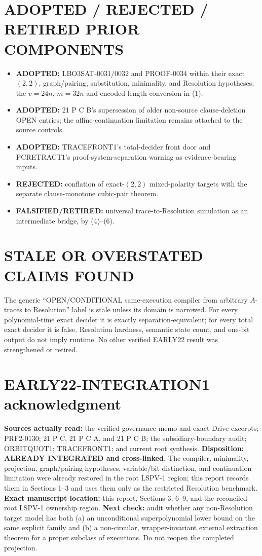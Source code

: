 \documentclass[11pt]{article}
\begin{document}
\section{ADOPTED / REJECTED / RETIRED PRIOR COMPONENTS}
\begin{itemize}
\item \textbf{ADOPTED:} LBO3SAT-0031/0032 and PROOF-0034 within their exact
$(2,2)$, graph/pairing, substitution, minimality, and Resolution hypotheses;
the $v=24n$, $m=32n$ and encoded-length conversion in (1).
\item \textbf{ADOPTED:} 21 P C B's supersession of older non-source
clause-deletion OPEN entries; the affine-continuation limitation remains
attached to the source controls.
\item \textbf{ADOPTED:} TRACEFRONT1's total-decider front door and
PCRETRACT1's proof-system-separation warning as evidence-bearing inputs.
\item \textbf{REJECTED:} conflation of exact-$(2,2)$ mixed-polarity targets
with the separate clause-monotone cubic-pair theorem.
\item \textbf{FALSIFIED/RETIRED:} universal trace-to-Resolution simulation
as an intermediate bridge, by (4)--(6).
\end{itemize}

\section{STALE OR OVERSTATED CLAIMS FOUND}
The generic ``OPEN/CONDITIONAL same-execution compiler from arbitrary
$A$-traces to Resolution'' label is stale unless its domain is narrowed.
For every polynomial-time exact decider it is exactly separation-equivalent;
for every total exact decider it is false.  Resolution hardness, semantic
state count, and one-bit output do not imply runtime.  No other verified
EARLY22 result was strengthened or retired.

\section{EARLY22-INTEGRATION1 acknowledgment}
\textbf{Sources actually read:} the verified governance memo and exact Drive
excerpts; PRF2-0130; 21 P C, 21 P C A, and 21 P C B; the subsidiary-boundary
audit; ORBITQUOT1; TRACEFRONT1; and current root synthesis.
\textbf{Disposition: ALREADY INTEGRATED and cross-linked.}  The compiler,
minimality, projection, graph/pairing hypotheses, variable/bit distinction,
and continuation limitation were already restored in the root LSPV-1 region;
this report records them in Sections 1--3 and uses them only as the restricted
Resolution benchmark.  \textbf{Exact manuscript location:} this report,
Sections 3, 6--9, and the reconciled root  LSPV-1 ownership
region.  \textbf{Next check:} audit whether any non-Resolution target model
has both (a) an unconditional superpolynomial lower bound on the same explicit
family and (b) a non-circular, wrapper-invariant external extraction theorem
for a proper subclass of executions.  Do not reopen the completed projection.
\end{document}
